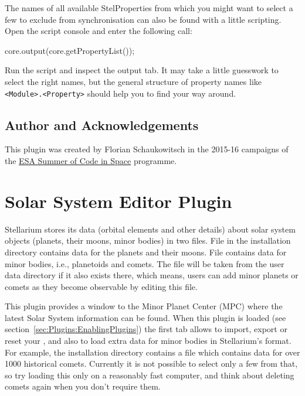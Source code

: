 The names of all available StelProperties from which you might want to select a few to exclude  
from synchronisation can also be found with a little scripting. 
Open the script console  and enter the following call:
\begin{commands}
core.output(core.getPropertyList());
\end{commands}
Run the script and inspect the output tab. It may take a little guesswork to select the right names, 
but the general structure of property names like 
\texttt{<Module>.<Property>} should help you to find your way around.

\subsection*{Author and Acknowledgements}

This plugin was created by Florian Schaukowitsch in the 2015-16 campaigns of the 
\href{http://sophia.estec.esa.int/socis/}{ESA Summer of Code in Space} 
programme. 

% 


\newpage

\section{Solar System Editor Plugin}
\label{sec:plugins:SolarSystemEditor}

Stellarium stores its data (orbital elements and other details) about
solar system objects (planets, their moons, minor bodies) in two files.  
File  in the installation directory contains data for the planets and their moons.
File  contains data for minor bodies, i.e., planetoids and comets.
 The file will be taken from the user data
directory if it also exists there, which means, users can add minor
planets or comets as they become observable by editing this file.


This plugin provides a window to the Minor Planet Center (MPC) where the
latest Solar System information can be found. When this plugin is
loaded (see section~\ref{sec:Plugins:EnablingPlugins}) the first tab
allows to import, export or reset your , 
and also to load extra data for minor bodies in Stellarium's  format. 
For example, the installation directory contains a file  which contains 
data for over 1000 historical comets. Currently it is not possible to select only a few from that, 
so try loading this only on a reasonably fast computer, and think about deleting comets again when 
you don't require them.

